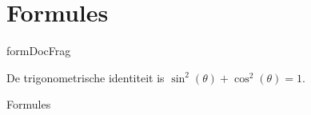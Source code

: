 \documentclass[presentatie.tex]{subfiles}
\begin{document}
\section{Formules}

\clearrecentlist
    



\begin{saveblock}{formDocFrag}
	\begin{highlightblock}[gobble=8,linewidth=25em,framexleftmargin=0.25em]
		De trigonometrische identiteit
		is $ \sin^2(\theta) + \cos^2(\theta) = 1 $.
	\end{highlightblock}
\end{saveblock}

\begin{frame}{Formules}
	\centering
	
	\vspace{10pt}
	\begin{center}%
	\end{center}
	
\end{frame}

\def\extraslistsep{\hspace{0.5em}\textcolor{red!80!black}{\vrule width 1pt height 0.6\baselineskip\relax}\hspace{0.5em}}
\def\es#1{\adjustbox{scale=0.8}{#1}}
\end{document}
